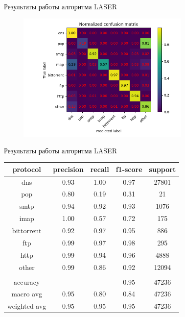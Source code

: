 \documentclass[10pt]{beamer}
\begin{document}
\begin{frame}{Результаты работы алгоритма LASER}
    \begin{figure}
        \begin{adjustwidth}{-2em}{-2em}
            \centering
            \includegraphics[width=23em]{results/laser_no_filtered/Normalized_confusion_matrix.png}
        \end{adjustwidth}
    \end{figure}
\end{frame}

\begin{frame}{Результаты работы алгоритма LASER}
    \begin{table}[]
        \begin{tabular}{|c|c|c|c|c|}
        \hline
        protocol     & precision & recall & f1-score & support \\ \hline
        dns          & 0.93      & 1.00   & 0.97     & 27801   \\ \hline
        pop          & 0.80      & 0.19   & 0.31     & 21      \\ \hline
        smtp         & 0.94      & 0.92   & 0.93     & 1076    \\ \hline
        imap         & 1.00      & 0.57   & 0.72     & 175     \\ \hline
        bittorrent   & 0.92      & 0.97   & 0.95     & 886     \\ \hline
        ftp          & 0.99      & 0.97   & 0.98     & 295     \\ \hline
        http         & 0.99      & 0.94   & 0.96     & 4888    \\ \hline
        other        & 0.99      & 0.86   & 0.92     & 12094   \\ \hline
                     &           &        &          &         \\ \hline
        accuracy     &           &        & 0.95     & 47236   \\ \hline
        macro avg    & 0.95      & 0.80   & 0.84     & 47236   \\ \hline
        weighted avg & 0.95      & 0.95   & 0.95     & 47236   \\ \hline
        \end{tabular}
        \end{table}
\end{frame}
\end{document}
